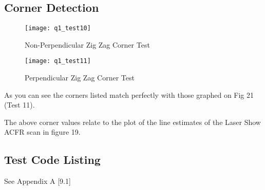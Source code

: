 	\pagebreak
	\subsection{Corner Detection}	%
		
		\linebreak
		
		\begin{figure}[position = here]
			\begin{centering}
				\texttt{[image: q1\_test10]}\\
				\caption[\textit{RPYAxes}]{Non-Perpendicular Zig Zag Corner Test}
			\end{centering}
		\end{figure}
		\newline
		
		\begin{figure}[position = here]
			\begin{centering}
				\texttt{[image: q1\_test11]}\\
				\caption[\textit{RPYAxes}]{Perpendicular Zig Zag Corner Test}
			\end{centering}
		\end{figure}
		\newline		
		\pagebreak
		
		\linebreak
		
		As you can see the corners listed match perfectly with those graphed on Fig 21 (Test 11).
		
		
		\linebreak
		The above corner values relate to the plot of the line estimates of the Laser Show ACFR scan in figure 19.
		
		\subsection*{Test Code Listing}
			See Appendix A [9.1]